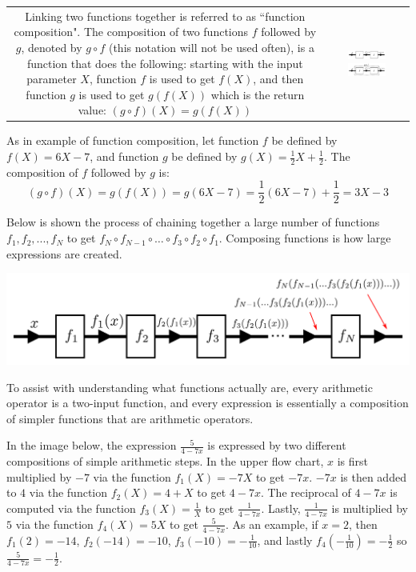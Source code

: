 \documentclass{article}
\begin{document}
\begin{tabular}{cc}
\parbox{0.5\textwidth}{
Linking two functions together is referred to as ``function composition". The composition of two functions \(f\) followed by \(g\), denoted by \(g \circ f\) (this notation will not be used often), is a function that does the following: starting with the input parameter \(X\), function \(f\) is used to get \(f(X)\), and then function \(g\) is used to get \(g(f(X))\) which is the return value: \((g \circ f)(X) = g(f(X))\)  
} & \parbox{0.5\textwidth}{
\includegraphics[width = 0.5\textwidth]{function_box_2_links} \\
\includegraphics[width = 0.5\textwidth]{function_box_composition}
}
\end{tabular}
As in example of function composition, let function \(f\) be defined by \(f(X) = 6X - 7\), and function \(g\) be defined by \(g(X) = \frac{1}{2}X + \frac{1}{2}\). The composition of \(f\) followed by \(g\) is:
\[(g \circ f)(X) = g(f(X)) = g(6X - 7) = \frac{1}{2}(6X - 7) + \frac{1}{2} = 3X - 3\]

Below is shown the process of chaining together a large number of functions \(f_1, f_2, ..., f_N\) to get \(f_N \circ f_{N-1} \circ \dots \circ f_3 \circ f_2 \circ f_1\). Composing functions is how large expressions are created.

\includegraphics[width = \textwidth]{function_box_chain}

To assist with understanding what functions actually are, every arithmetic operator is a two-input function, and every expression is essentially a composition of simpler functions that are arithmetic operators.

In the image below, the expression \(\frac{5}{4 - 7x}\) is expressed by two different compositions of simple arithmetic steps. In the upper flow chart, \(x\) is first multiplied by \(-7\) via the function \(f_1(X) = -7X\) to get \(-7x\). \(-7x\) is then added to \(4\) via the function \(f_2(X) = 4 + X\) to get \(4 - 7x\). The reciprocal of \(4 - 7x\) is computed via the function \(f_3(X) = \frac{1}{X}\) to get \(\frac{1}{4 - 7x}\). Lastly, \(\frac{1}{4 - 7x}\) is multiplied by \(5\) via the function \(f_4(X) = 5X\) to get \(\frac{5}{4 - 7x}\). As an example, if \(x = 2\), then \(f_1(2) = -14\), \(f_2(-14) = -10\), \(f_3(-10) = -\frac{1}{10}\), and lastly \(f_4(-\frac{1}{10}) = -\frac{1}{2}\) so \(\frac{5}{4 - 7x} = -\frac{1}{2}\). 
\end{document}
